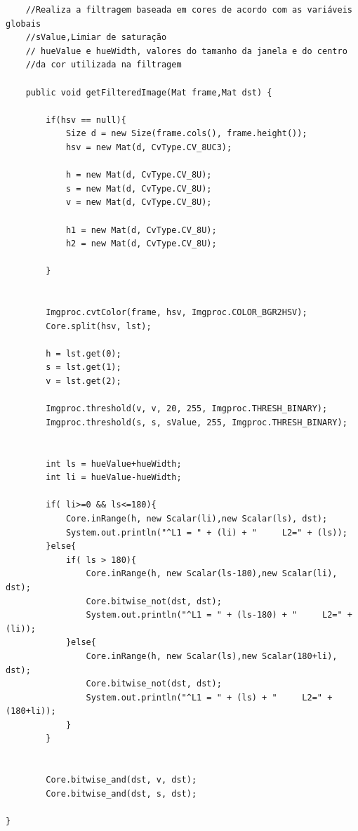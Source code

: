 \documentclass[
	article,			%
	11pt,				%
	oneside,			%
	a4paper,			%
	english,			%
	brazil,				%
	sumario=tradicional
	]{abntex2}
\begin{document}
\begin{apendicesenv}
\begin{lstlisting}
	//Realiza a filtragem baseada em cores de acordo com as variáveis globais
	//sValue,Limiar de saturação
	// hueValue e hueWidth, valores do tamanho da janela e do centro 
	//da cor utilizada na filtragem
	 
	public void getFilteredImage(Mat frame,Mat dst) {
		
		if(hsv == null){
			Size d = new Size(frame.cols(), frame.height());
			hsv = new Mat(d, CvType.CV_8UC3);
			
			h = new Mat(d, CvType.CV_8U);
			s = new Mat(d, CvType.CV_8U);
			v = new Mat(d, CvType.CV_8U);
			
			h1 = new Mat(d, CvType.CV_8U);
			h2 = new Mat(d, CvType.CV_8U);
		
		}
		
		
		Imgproc.cvtColor(frame, hsv, Imgproc.COLOR_BGR2HSV);
	    Core.split(hsv, lst);
		
	    h = lst.get(0);
	    s = lst.get(1);
	    v = lst.get(2);
	    
		Imgproc.threshold(v, v, 20, 255, Imgproc.THRESH_BINARY);
		Imgproc.threshold(s, s, sValue, 255, Imgproc.THRESH_BINARY);
		
		
		int ls = hueValue+hueWidth;
		int li = hueValue-hueWidth;
		
		if( li>=0 && ls<=180){
			Core.inRange(h, new Scalar(li),new Scalar(ls), dst);
			System.out.println("^L1 = " + (li) + "     L2=" + (ls));
		}else{
			if( ls > 180){
				Core.inRange(h, new Scalar(ls-180),new Scalar(li), dst);
				Core.bitwise_not(dst, dst);
				System.out.println("^L1 = " + (ls-180) + "     L2=" + (li));
			}else{
				Core.inRange(h, new Scalar(ls),new Scalar(180+li), dst);
				Core.bitwise_not(dst, dst);
				System.out.println("^L1 = " + (ls) + "     L2=" + (180+li));
			}
		}
			
		
		Core.bitwise_and(dst, v, dst);
		Core.bitwise_and(dst, s, dst);

}
\end{lstlisting}

\end{apendicesenv}



\end{document}
